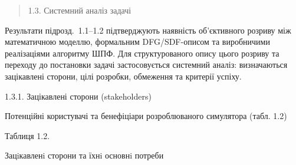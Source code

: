 \begin{quote}
\protect{}\label{_Toc229682907}{}1.3. Системний аналіз
задачі
\end{quote}

Результати підрозд.~1.1--1.2 підтверджують наявність об'єктивного
розриву між математичною моделлю, формальним DFG/SDF-описом та
виробничими реалізаціями алгоритму ШПФ. Для структурованого опису цього
розриву та переходу до постановки задачі застосовується системний
аналіз: визначаються зацікавлені сторони, цілі розробки, обмеження та
критерії успіху.

1.3.1. Зацікавлені сторони (stakeholders)

Потенційні користувачі та бенефіціари розроблюваного симулятора (табл.
1.2)

Таблиця 1.2.

Зацiкавленi сторони та їхнi основнi потреби

